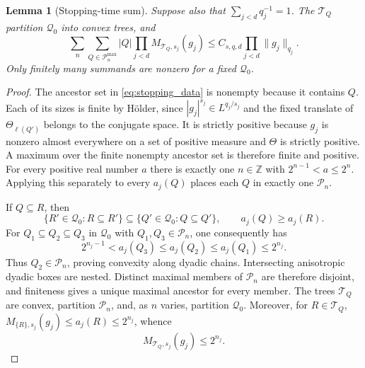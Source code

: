 \documentclass[12pt,reqno]{amsart}
\theoremstyle{plain}
\newtheorem{lemma}[theorem]{Lemma}
\theoremstyle{definition}
\theoremstyle{remark}
\numberwithin{equation}{section}
\newcommand{\Z}{\mathbb Z}
\newcommand{\T}{\mathcal T}
\begin{document}
\begin{lemma}[Stopping-time sum]\label{lem:stopping}
Suppose also that $\sum_{j<d}q_j^{-1}=1$. The $\T_Q$ partition
$\mathcal Q_0$ into convex trees, and
\begin{equation}\label{eq:stopping_sum}
 \sum_n\sum_{Q\in\mathcal P_n^{\max}}|Q|
             \prod_{j<d}M_{\T_Q,s_j}(g_j)
 \le C_{s,q,d}\prod_{j<d}\|g_j\|_{q_j}.
\end{equation}
Only finitely many summands are nonzero for a fixed $\mathcal Q_0$.
\end{lemma}
\begin{proof}
The ancestor set in \eqref{eq:stopping_data} is nonempty because
it contains $Q$. Each of its sizes is finite by H\"older, since
$|g_j|^{s_j}\in L^{q_j/s_j}$ and the fixed translate of
$\Theta_{\ell(Q')}$ belongs to the conjugate space. It is strictly
positive because $g_j$ is nonzero almost everywhere on a set of
positive measure and $\Theta$ is strictly positive. A maximum over
the finite nonempty ancestor set is therefore finite and positive.
For every positive real number $a$ there is exactly one $n\in\Z$
with $2^{n-1}<a\le2^n$. Applying this separately to every $a_j(Q)$
places each $Q$ in exactly one $\mathcal P_n$.

If $Q\subseteq R$, then
\[
 \{R'\in\mathcal Q_0:R\subseteq R'\}
 \subseteq\{Q'\in\mathcal Q_0:Q\subseteq Q'\},
 \qquad a_j(Q)\ge a_j(R).
\]
For $Q_1\subseteq Q_2\subseteq Q_3$ in $\mathcal Q_0$ with
$Q_1,Q_3\in\mathcal P_n$, one consequently has
\[
 2^{n_j-1}<a_j(Q_3)\le a_j(Q_2)\le a_j(Q_1)\le2^{n_j}.
\]
Thus $Q_2\in\mathcal P_n$, proving convexity along dyadic chains.
Intersecting anisotropic dyadic boxes are nested. Distinct maximal
members of $\mathcal P_n$ are therefore disjoint, and finiteness
gives a unique maximal ancestor for every member. The trees
$\T_Q$ are convex, partition $\mathcal P_n$, and, as $n$ varies,
partition $\mathcal Q_0$. Moreover, for $R\in\T_Q$,
$M_{\{R\},s_j}(g_j)\le a_j(R)\le2^{n_j}$, whence
\begin{equation}\label{eq:stopping_tree_size}
 M_{\T_Q,s_j}(g_j)\le2^{n_j}.
\end{equation}


\end{proof}
\end{document}
